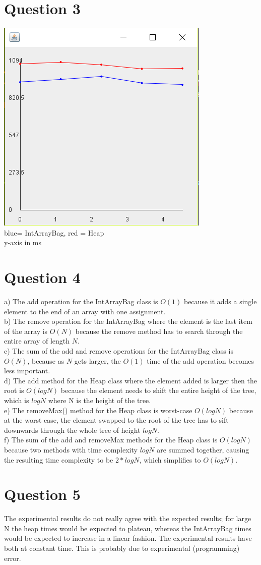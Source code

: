 \documentclass[12pt]{article} %
\begin{document}
\section{Question 3}
\includegraphics{graph.png}
\\blue= IntArrayBag, red = Heap
\\y-axis in ms
\section{Question 4}
a) The add operation for the IntArrayBag class is $O(1)$ because it adds a single element to the end of an array with one assignment.
\\b) The remove operation for the IntArrayBag where the element is the last item of the array is $O(N)$ because the remove method has to search through the entire array of length $N$.
\\c) The sum of the add and remove operations for the IntArrayBag class is $O(N)$, because as $N$ gets larger, the $O(1)$ time of the add operation becomes less important.
\\d) The add method for the Heap class where the element added is larger then the root is $O(log N)$ because the element needs to shift the entire height of the tree, which is $log N$ where N is the height of the tree.
\\e) The removeMax() method for the Heap class is worst-case $O(log N)$ because at the worst case, the element swapped to the root of the tree has to sift downwards through the whole tree of height $log N$.
\\f) The sum of the add and removeMax methods for the Heap class is $O(log N)$ because two methods with time complexity $log N$ are summed together, causing the resulting time complexity to be $2*log N$, which simplifies to $O(log N)$.

\section{Question 5}
The experimental results do not really agree with the expected results; for large N the heap times would be expected to plateau, whereas the IntArrayBag times would be expected to increase in a linear fashion. The experimental results have both at constant time. This is probably due to experimental (programming) error.
\end{document}
